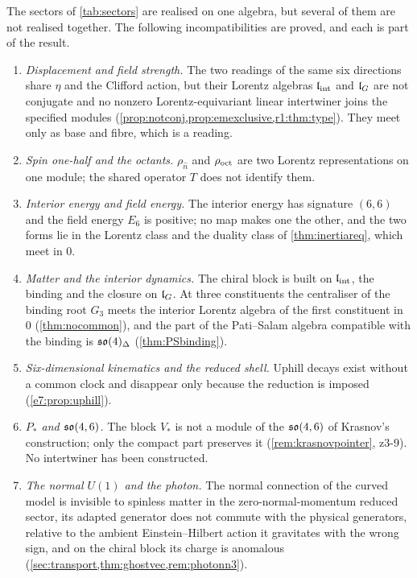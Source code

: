 The sectors of \cref{tab:sectors} are realised on one algebra, but several of them are not realised together. The following
incompatibilities are proved, and each is part of the result.
\begin{enumerate}[label=(\arabic*),leftmargin=2.2em]
\item \emph{Displacement and field strength.} The two readings of the same six directions share $\eta$ and the Clifford action, but their
Lorentz algebras $\mathfrak l_{\rm int}$ and $\mathfrak l_G$ are not conjugate and no nonzero Lorentz-equivariant linear intertwiner joins the specified modules (\cref{prop:notconj,prop:emexclusive,r1:thm:type}). They
meet only as base and fibre, which is a reading.
\item \emph{Spin one-half and the octants.} $\rho_{\hat n}$ and $\rho_{\rm oct}$ are two Lorentz representations on one module; the shared
operator $T$ does not identify them.
\item \emph{Interior energy and field energy.} The interior energy has signature $(6,6)$ and the field energy $E_6$ is positive; no map makes
one the other, and the two forms lie in the Lorentz class and the duality class of \cref{thm:inertiareq}, which meet in $0$.
\item \emph{Matter and the interior dynamics.} The chiral block is built on $\mathfrak l_{\rm int}$, the binding and the closure on $\mathfrak l_G$. At three
constituents the centraliser of the binding root $G_3$ meets the interior Lorentz algebra of the first constituent in $0$ (\cref{thm:nocommon}), and the part of
the Pati--Salam algebra compatible with the binding is $\mathfrak{so}(4)_\Delta$ (\cref{thm:PSbinding}).
\item \emph{Six-dimensional kinematics and the reduced shell.} Uphill decays exist without a common clock and disappear only because the
reduction is imposed (\cref{e7:prop:uphill}).
\item \emph{$P_*$ and $\mathfrak{so}(4,6)$.} The block $V_*$ is not a module of the $\mathfrak{so}(4,6)$ of Krasnov's construction; only the compact part preserves it
(\cref{rem:krasnovpointer}, z3-9). No intertwiner has been constructed.
\item \emph{The normal $U(1)$ and the photon.} The normal connection of the curved model is invisible to spinless matter in the zero-normal-momentum
reduced sector, its adapted generator
does not commute with the physical generators, relative to the ambient Einstein--Hilbert action it gravitates with the wrong sign, and on the chiral block its charge is anomalous
(\cref{sec:transport,thm:ghostvec,rem:photonn3}).
\end{enumerate}

